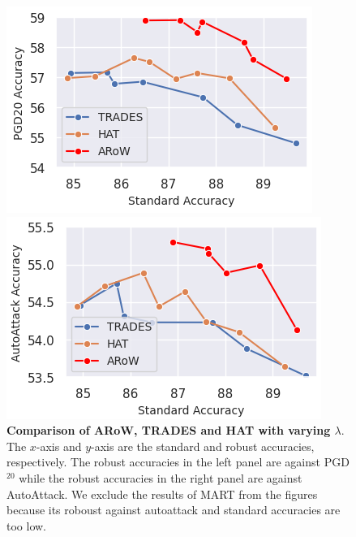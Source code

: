 \documentclass[nohyperref]{article}
\theoremstyle{plain}
\theoremstyle{definition}
\theoremstyle{remark}
\begin{document}
\begin{figure}[ht]
\begin{center}
\begin{minipage}[c]{0.45\linewidth}
\includegraphics[width=\linewidth]{standard_pgd.PNG}
\end{minipage}
\hfill
\begin{minipage}[c]{0.45\linewidth}
\includegraphics[width=\linewidth]{standard_aa.PNG}
\end{minipage}
\caption{\textbf{Comparison of ARoW, TRADES and HAT with varying $\lambda$}.
The $x$-axis and $y$-axis are the standard and robust accuracies, respectively. The robust accuracies in the left panel are against PGD$^{20}$ while the robust accuracies in the right panel are against AutoAttack. 
We exclude the results of MART from the figures because its roboust against autoattack and standard accuracies are too low.}
\label{fig1}
\end{center}
\end{figure}
\end{document}
